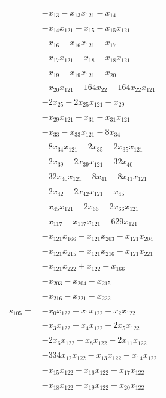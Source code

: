 \begin{longtable}{@{}r@{\;}l@{}}
 & \(\displaystyle -x_{13} -x_{13}x_{121} -x_{14}\) \\
 & \(\displaystyle -x_{14}x_{121} -x_{15} -x_{15}x_{121}\) \\
 & \(\displaystyle -x_{16} -x_{16}x_{121} -x_{17}\) \\
 & \(\displaystyle -x_{17}x_{121} -x_{18} -x_{18}x_{121}\) \\
 & \(\displaystyle -x_{19} -x_{19}x_{121} -x_{20}\) \\
 & \(\displaystyle -x_{20}x_{121} -164x_{22} -164x_{22}x_{121}\) \\
 & \(\displaystyle -2x_{25} -2x_{25}x_{121} -x_{29}\) \\
 & \(\displaystyle -x_{29}x_{121} -x_{31} -x_{31}x_{121}\) \\
 & \(\displaystyle -x_{33} -x_{33}x_{121} -8x_{34}\) \\
 & \(\displaystyle -8x_{34}x_{121} -2x_{35} -2x_{35}x_{121}\) \\
 & \(\displaystyle -2x_{39} -2x_{39}x_{121} -32x_{40}\) \\
 & \(\displaystyle -32x_{40}x_{121} -8x_{41} -8x_{41}x_{121}\) \\
 & \(\displaystyle -2x_{42} -2x_{42}x_{121} -x_{45}\) \\
 & \(\displaystyle -x_{45}x_{121} -2x_{66} -2x_{66}x_{121}\) \\
 & \(\displaystyle -x_{117} -x_{117}x_{121} -629x_{121}\) \\
 & \(\displaystyle -x_{121}x_{166} -x_{121}x_{203} -x_{121}x_{204}\) \\
 & \(\displaystyle -x_{121}x_{215} -x_{121}x_{216} -x_{121}x_{221}\) \\
 & \(\displaystyle -x_{121}x_{222} +x_{122} -x_{166}\) \\
 & \(\displaystyle -x_{203} -x_{204} -x_{215}\) \\
 & \(\displaystyle -x_{216} -x_{221} -x_{222}\) \\[3pt]
\(s_{105}=\) & \(\displaystyle -x_{0}x_{122} -x_{1}x_{122} -x_{2}x_{122}\) \\
 & \(\displaystyle -x_{3}x_{122} -x_{4}x_{122} -2x_{5}x_{122}\) \\
 & \(\displaystyle -2x_{6}x_{122} -x_{8}x_{122} -2x_{11}x_{122}\) \\
 & \(\displaystyle -334x_{12}x_{122} -x_{13}x_{122} -x_{14}x_{122}\) \\
 & \(\displaystyle -x_{15}x_{122} -x_{16}x_{122} -x_{17}x_{122}\) \\
 & \(\displaystyle -x_{18}x_{122} -x_{19}x_{122} -x_{20}x_{122}\) \\

\end{longtable}
